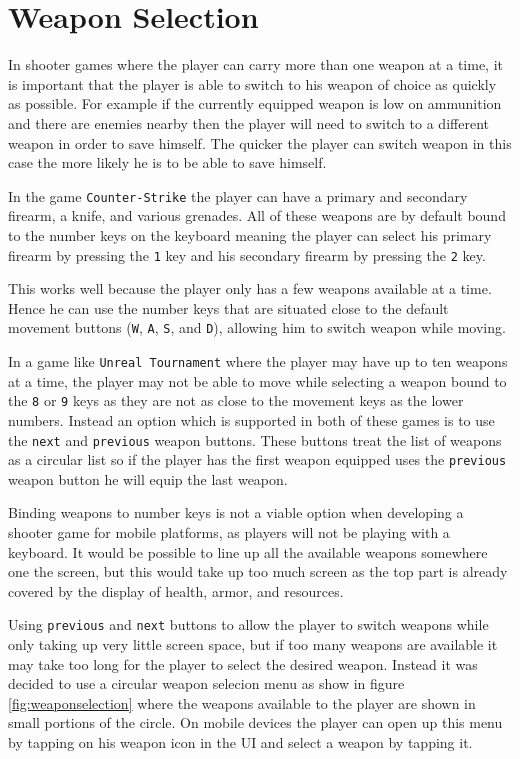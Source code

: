 \section{Weapon Selection}
\label{sec:modules:controlscheme:weaponselection}

In shooter games where the player can carry more than one weapon at a time, it is important that the player is able to switch to his weapon of choice as quickly as possible. For example if the currently equipped weapon is low on ammunition and there are enemies nearby then the player will need to switch to a different weapon in order to save himself. The quicker the player can switch weapon in this case the more likely he is to be able to save himself.

In the game \texttt{Counter-Strike}\cite{counterstrike} the player can have a primary and secondary firearm, a knife, and various grenades. All of these weapons are by default bound to the number keys on the keyboard meaning the player can select his primary firearm by pressing the \texttt{1} key and his secondary firearm by pressing the \texttt{2} key. 

This works well because the player only has a few weapons available at a time. Hence he can use the number keys that are situated close to the default movement buttons (\texttt{W}, \texttt{A}, \texttt{S}, and \texttt{D}), allowing him to switch weapon while moving.

In a game like \texttt{Unreal Tournament}\cite{unrealtournament} where the player may have up to ten weapons at a time, the player may not be able to move while selecting a weapon bound to the \texttt{8} or \texttt{9} keys as they are not as close to the movement keys as the lower numbers.
Instead an option which is supported in both of these games is to use the \texttt{next} and \texttt{previous} weapon buttons. These buttons treat the list of weapons as a circular list so if the player has the first weapon equipped uses the \texttt{previous} weapon button he will equip the last weapon.

Binding weapons to number keys is not a viable option when developing a shooter game for mobile platforms, as players will not be playing with a keyboard. It would be possible to line up all the available weapons somewhere one the screen, but this would take up too much screen as the top part is already covered by the display of health, armor, and resources.

Using \texttt{previous} and \texttt{next} buttons to allow the player to switch weapons while only taking up very little screen space, but if too many weapons are available it may take too long for the player to select the desired weapon.
Instead it was decided to use a circular weapon selecion menu as show in figure \ref{fig:weaponselection} where the weapons available to the player are shown in small portions of the circle. On mobile devices the player can open up this menu by tapping on his weapon icon in the UI and select a weapon by tapping it.

